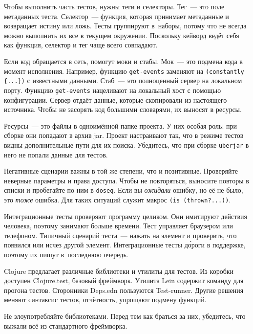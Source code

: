 Чтобы выполнить часть тестов, нужны теги и селекторы. Тег~--- это поле метаданных
теста. Селектор~--- функция, которая принимает метаданные и возвращает истину
или ложь. Тесты группируют в~наборы, потому что не всегда можно выполнить их все
в текущем окружении. Поскольку кейворд ведёт себя как функция, селектор и
тег чаще всего совпадают.

Если код обращается в сеть, помогут моки и стабы. Мок~--- это подмена кода в момент
исполнения. Например, функцию \verb|get-events| заменяют на
\verb|(constantly {...})| с известными данными. Стаб~--- это полноценный сервер на
локальном порту. Функцию \verb|get-events| нацеливают на локальный хост с
помощью конфигурации. Сервер отдаёт данные, которые скопировали из настоящего
источника. Чтобы не засорять код большими словарями, их выносят в ресурсы.

Ресурсы~--- это файлы в одноимённой папке проекта. У них особая роль: при сборке они
попадают в архив jar. Проект настраивают так, что в режиме тестов видны
дополнительные пути для их поиска. Убедитесь, что при сборке \verb|uberjar| в
него не попали данные для тестов.

Негативные сценарии важны в той же степени, что и позитивные. Проверяйте
неверные параметры и права доступа. Чтобы не повторяться, выносите повторы в
списки и пробегайте по ним в \verb|doseq|. Если вы \emph{ожидали} ошибку, но
её не было, это \emph{тоже} ошибка. Для таких ситуаций служит
макрос \verb|(is (thrown?...))|.

Интеграционные тесты проверяют программу целиком. Они имитируют действия
человека, поэтому занимают больше времени. Тест управляет браузером или
телефоном. Типичный сценарий теста~--- нажать на элемент и проверить, что
появился или исчез другой элемент. Интеграционные тесты д\'{о}роги в поддержке,
поэтому их пишут в~последнюю очередь.

Clojure предлагает различные библиотеки и утилиты для тестов. Из коробки
доступен Clojure.test, базовый фреймворк. Утилита Lein содержит команду для
прогона тестов. Сторонники Deps.edn пользуются Test-runner. Другие решения
меняют синтаксис тестов, отчётность, упрощают подмену функций.

Не злоупотребляйте библиотеками. Перед тем как браться за них, убедитесь, что
выжали всё из стандартного фреймворка.
